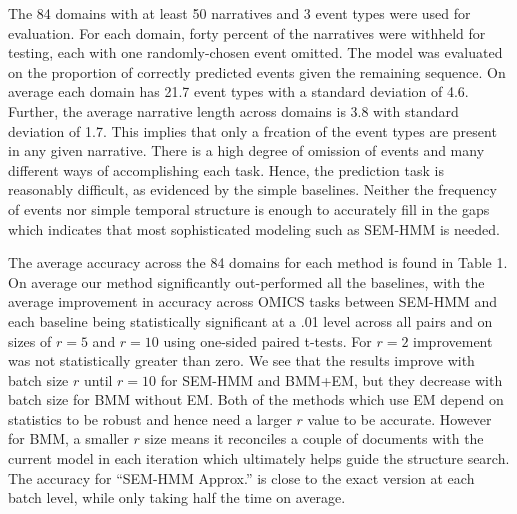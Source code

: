 \documentclass[letterpaper]{article}
\begin{document}
The 84 domains with at least 50 narratives and 3 event types were used for evaluation.
For each domain, forty percent of the narratives were withheld for testing, each with one randomly-chosen event omitted.  The model was evaluated on the proportion of correctly predicted events given the remaining sequence.
On average each domain has 21.7 event types with a standard deviation of 4.6.  Further, the average narrative length across domains is 3.8 with standard deviation of 1.7.  This implies that
only a frcation of the event types are present in any given narrative.
There is a high degree of omission of events and many different ways of accomplishing each task.
Hence, the prediction task is reasonably difficult, as evidenced by the simple baselines.
Neither the frequency of events nor simple temporal structure is enough to accurately fill in the gaps which indicates that most sophisticated modeling such as SEM-HMM is needed.

The average accuracy across the 84 domains for each method is found in Table 1.
On average our method significantly out-performed all the baselines, with the average improvement in accuracy across OMICS tasks between SEM-HMM and each baseline being statistically significant at a .01 level across all pairs and on sizes of $r = 5$ and $r= 10$ using one-sided paired t-tests.  For $r=2$ improvement was not statistically greater than zero. %
We see that the results improve with batch size $r$ until $r=10$ for
SEM-HMM and BMM+EM, but they decrease with batch size for BMM without EM.
Both of the methods which use EM depend on statistics to be robust and hence need a larger $r$ value to be accurate.  However for BMM, a smaller $r$ size means it reconciles a couple of documents with the current model in each iteration which ultimately helps guide the structure search.
The accuracy for ``SEM-HMM Approx.'' is close to the exact version at each batch level, while only taking half the time on average.
\end{document}
